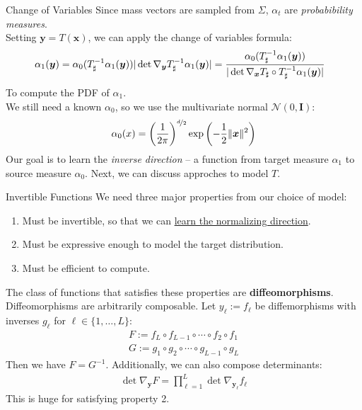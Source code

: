 \documentclass{beamer}
\begin{document}
\begin{frame}{Change of Variables}
	Since mass vectors are sampled from $\Sigma$, $\alpha_t$ are \textit{probabibility measures}. \pause \newline \\

	Setting $\bm{y} = T(\bm{x})$, we can apply the change of variables formula:
	\begin{gather}
		\hspace{-.8em}\alpha_1(\bm{y}) = \alpha_0( T^{-1}_\sharp \alpha_1(\bm{y})) | \det \nabla_{\bm{y}} T_\sharp^{-1} \alpha_1(\bm{y}) | = \frac{\alpha_0( T^{-1}_\sharp \alpha_1(\bm{y}))}{|\det \nabla_{\bm{x}} T_\sharp \circ T_\sharp^{-1} \alpha_1(\bm{y})|}
	\end{gather}
	To compute the PDF of $\alpha_1$. \pause \newline \\

	We still need a known $\alpha_0$, so we use the multivariate normal $\mathcal{N}(0, \bm{I})$:
	\begin{gather}
		\alpha_0(x) = \left(\frac{1}{2\pi}\right)^{\nicefrac{d}{2}} \exp\left(-\frac{1}{2} \| \bm{x} \|^2 \right)
	\end{gather} \pause
	Our goal is to learn the \textit{inverse direction} -- a function from target measure $\alpha_1$ to source measure $\alpha_0$. Next, we can discuss approches to model $T$.
\end{frame}

\begin{frame}{Invertible Functions}
	We need three major properties from our choice of model:
	\begin{enumerate}[label=\arabic*.]
		\item Must be invertible, so that we can \underline{learn the normalizing direction}. \pause
		\item Must be expressive enough to model the target distribution. \pause
		\item Must be efficient to compute. \pause
	\end{enumerate}
	The class of functions that satisfies these properties are \textbf{diffeomorphisms}. \pause \newline \\

	Diffeomorphisms are arbitrarily composable. Let $y_{\ell} := f_{\ell}$ be diffemorphisms with inverses $g_{\ell}$ for $\ell \in \{1, \ldots, L\}$:
	\begin{gather}
		F := f_{L} \circ f_{L-1} \circ \cdots \circ f_{2} \circ f_{1} \\
		G := g_{1} \circ g_{2} \circ \cdots \circ g_{L-1} \circ g_{L}
	\end{gather}
	Then we have $F = G^{-1}$. \pause Additionally, we can also compose determinants:
	\begin{gather}
		\det \nabla_{\bm{y}} F = \prod^L_{\ell=1} \det \nabla_{\bm{y}_\ell} f_{\ell}
	\end{gather} \pause
	This is huge for satisfying property 2.
\end{frame}
\end{document}
